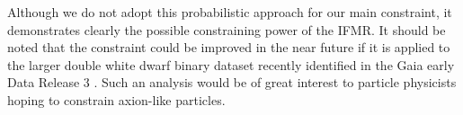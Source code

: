 Although we do not adopt this probabilistic approach for our main constraint, it demonstrates clearly the possible constraining power of the IFMR. It should be noted that the constraint \cite{Andrews} could be improved in the near future if it is applied to the larger double white dwarf binary dataset recently identified in the Gaia early Data Release 3 \cite{2021arXiv210105282E}. Such an analysis would be of great interest to particle physicists hoping to constrain axion-like particles.